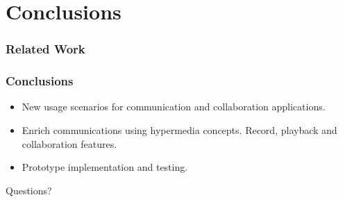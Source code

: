 \documentclass[compress]{beamer}
\begin{document}
\begin{frame}[c]
\begin{ganttchart}{1}{36}


\end{ganttchart}

	\end{frame}




\section{Conclusions}\label{concl} %
\begin{frame}[t,shrink]
\frametitle{Related Work} 
\end{frame}

\begin{frame}[c]
		\frametitle{Conclusions}
		\begin{itemize}
\item New usage scenarios for communication and collaboration applications.
		\vfill

\item Enrich communications using hypermedia concepts. Record, playback and collaboration features.
		\vfill

\item Prototype implementation and testing.
		\end{itemize}

	\end{frame}






\begin{frame}[c]
\Huge{\centerline{Questions?}}
\end{frame}

\end{document}
